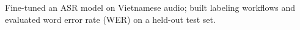 
\vspace{3pt}
\begin{resume_list}
  \item Fine-tuned an ASR model on Vietnamese audio; built labeling workflows and evaluated word error rate (WER) on a held-out test set.
\end{resume_list}

